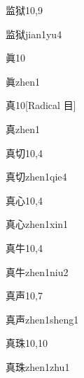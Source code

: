 \begin{entry}{监狱}{10,9}
  \begin{phonetics}{监狱}{jian1yu4}
  \end{phonetics}
\end{entry}

\begin{entry}{眞}{10}
  \begin{phonetics}{眞}{zhen1}
  \end{phonetics}
\end{entry}

\begin{entry}{真}{10}[Radical 目]
  \begin{phonetics}{真}{zhen1}
  \end{phonetics}
\end{entry}

\begin{entry}{真切}{10,4}
  \begin{phonetics}{真切}{zhen1qie4}
  \end{phonetics}
\end{entry}

\begin{entry}{真心}{10,4}
  \begin{phonetics}{真心}{zhen1xin1}
  \end{phonetics}
\end{entry}

\begin{entry}{真牛}{10,4}
  \begin{phonetics}{真牛}{zhen1niu2}
  \end{phonetics}
\end{entry}

\begin{entry}{真声}{10,7}
  \begin{phonetics}{真声}{zhen1sheng1}
  \end{phonetics}
\end{entry}

\begin{entry}{真珠}{10,10}
  \begin{phonetics}{真珠}{zhen1zhu1}
  \end{phonetics}
\end{entry}

